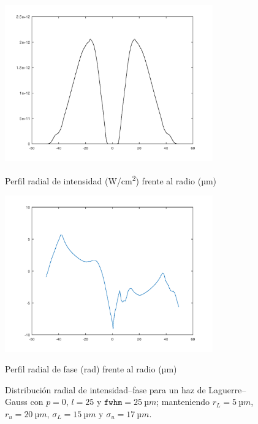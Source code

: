 \begin{figure}[htbp]
  \centering
  \begin{subcaptionblock}{.4\textwidth}
    \centering
    \includegraphics[width=0.8\textwidth]{Figuras/ch4_int_ase.png}
    \caption{Perfil radial de intensidad (\unit{W/cm^2}) frente al radio (\unit{µm})}\label{fig:ch4_ase1}
  \end{subcaptionblock}
  \begin{subcaptionblock}{.4\textwidth}
    \centering
    \includegraphics[width=0.8\textwidth]{Figuras/ch4_fs_ase.png}
    \caption{Perfil radial de fase (\unit{rad}) frente al radio (\unit{µm})}\label{fig:ch4_ase2}
  \end{subcaptionblock}
   \caption{Distribución radial de intensidad--fase para un haz de Laguerre--Gauss con $p=0$, $l=25$ y $\texttt{fwhm}=\qty{25}{µm}$; manteniendo $r_{L}=\qty{5}{µm}$, $r_{u}=\qty{20}{µm}$, $\sigma_{L}=\qty{15}{µm}$ y $\sigma_{u}=\qty{17}{µm}$.}
   \label{fig:4.39}
\end{figure}

